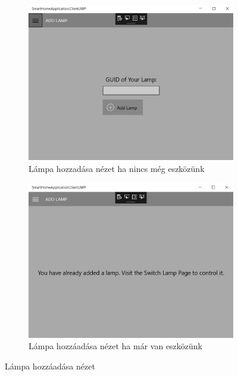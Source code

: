 \documentclass[a4paper,12pt]{report}
\begin{document}
    \begin{figure}[h!]
        \centering
        \begin{subfigure}[b]{0.4\linewidth}
            \includegraphics[width=\linewidth]{images/addlampview.jpg}
            \caption{Lámpa hozzadása nézet ha nincs még eszközünk}
        \end{subfigure}
        \begin{subfigure}[b]{0.4\linewidth}
            \includegraphics[width=\linewidth]{images/alreadyhaslamp.jpg}
            \caption{Lámpa hozzáadása nézet ha már van eszközünk}
        \end{subfigure}
        \caption{Lámpa hozzáadása nézet}
        \label{fig:AddLampView}
    \end{figure}
\end{document}
